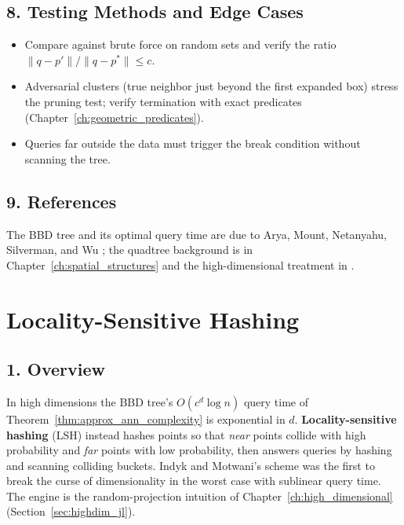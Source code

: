 \subsection{8. Testing Methods and Edge Cases}

\begin{itemize}
\item Compare against brute force on random sets and verify the ratio
  $\|q - p'\| / \|q - p^*\| \leq c$.
\item Adversarial clusters (true neighbor just beyond the first expanded
  box) stress the pruning test; verify termination with exact predicates
  (Chapter~\ref{ch:geometric_predicates}).
\item Queries far outside the data must trigger the break condition without
  scanning the tree.
\end{itemize}

\subsection{9. References}

The BBD tree and its optimal query time are due to Arya, Mount, Netanyahu,
Silverman, and Wu \cite{arya1998}; the quadtree background is in
Chapter~\ref{ch:spatial_structures} and the high-dimensional treatment in
\cite{harpeled2011}.


\section{Locality-Sensitive Hashing}
\label{sec:approx_lsh}

\subsection{1. Overview}

In high dimensions the BBD tree's $O(c^d \log n)$ query time of
Theorem~\ref{thm:approx_ann_complexity} is exponential in $d$.
\textbf{Locality-sensitive hashing} (LSH)
instead hashes points so that \emph{near} points collide with high
probability and \emph{far} points with low probability, then answers queries
by hashing and scanning colliding buckets. Indyk and Motwani's scheme
\cite{indyk1998} was the first to break the curse of dimensionality in the
worst case with sublinear query time. The engine is the random-projection
intuition of Chapter~\ref{ch:high_dimensional} (Section~\ref{sec:highdim_jl}).

